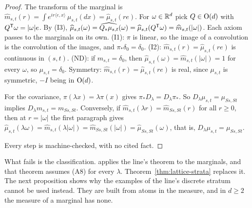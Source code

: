 \begin{proof}
\leanok
The transform of the marginal is $\widehat m_{s,t}(r) = \int e^{ir\langle e, x\rangle}\,\mu_{s,t}(dx)
= \widehat\mu_{s,t}(re)$. For $\omega \in \mathbb{R}^d$ pick $Q \in \mathrm{O}(d)$ with $Q^{\mathsf{T}}\omega = |\omega|e$.
By (I3), $\widehat\mu_{s,t}(\omega) = \widehat{Q_*\mu_{s,t}}(\omega) = \widehat\mu_{s,t}(Q^{\mathsf{T}}\omega)
= \widehat m_{s,t}(|\omega|)$. Each axiom passes to the marginals on its own. (I1): $\pi$ is linear,
so the image of a convolution is the convolution of the images, and $\pi_*\delta_0 = \delta_0$.
(I2): $\widehat m_{s,t}(r) = \widehat\mu_{s,t}(re)$ is continuous in $(s,t)$. (ND): if
$m_{s,t} = \delta_0$, then $\widehat\mu_{s,t}(\omega) = \widehat m_{s,t}(|\omega|) = 1$ for every
$\omega$, so $\mu_{s,t} = \delta_0$. Symmetry: $\widehat m_{s,t}(r) = \widehat\mu_{s,t}(re)$ is real,
since $\mu_{s,t}$ is symmetric, $-I$ being in $\mathrm{O}(d)$.

For the covariance, $\pi(\lambda x) = \lambda\pi(x)$ gives $\pi_*D_\lambda = D_\lambda\pi_*$. So
$D_\lambda\mu_{s,t} = \mu_{Ss,St}$ implies $D_\lambda m_{s,t} = m_{Ss,St}$. Conversely, if
$\widehat m_{s,t}(\lambda r) = \widehat m_{Ss,St}(r)$ for all $r \ge 0$, then at $r = |\omega|$ the
first paragraph gives $\widehat\mu_{s,t}(\lambda\omega) = \widehat m_{s,t}(\lambda|\omega|) =
\widehat m_{Ss,St}(|\omega|) = \widehat\mu_{Ss,St}(\omega)$, that is,
$D_\lambda\mu_{s,t} = \mu_{Ss,St}$.

Every step is machine-checked, with no cited fact.
\end{proof}

What fails is the classification.  applies the line's theorem to
the marginals, and that theorem assumes (A8) for every $\lambda$. Theorem~\ref{thm:lattice-strata}
replaces it. The next proposition shows why the examples of the line's discrete stratum cannot be
used instead. They are built from atoms in the \Levy{} measure, and in $d \ge 2$ the \Levy{} measure
of a marginal has none.

